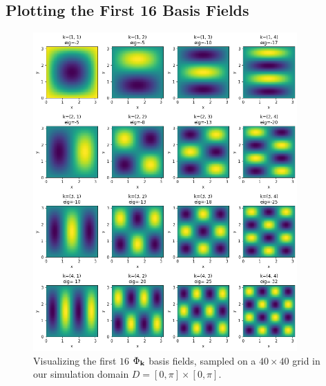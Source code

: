 \appendix
\chapter*{\fuggelek}
\setcounter{chapter}{\appendixnumber}

\section{Plotting the First 16 Basis Fields}
\label{appendix:first_16}

\begin{figure}[!htb]
  \centering
    \includegraphics[width=0.9\textwidth]{figures/eigenfluids/16_basis_fields.png}
    \caption{Visualizing the first $16$ $\Phi_{\vb{k}}$ basis fields, sampled on
    a $40 \times 40$ grid in our simulation domain $D = [0,\pi] \times
  [0,\pi]$.}
\end{figure}
